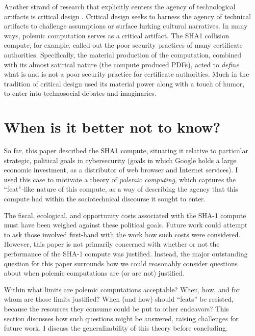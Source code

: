 \documentclass[sigconf]{acmart}
\begin{document}
Another strand of research that explicitly centers the agency of technological artifacts
is critical design \cite{Dunne2001}.
Critical design seeks to harness the agency of technical artifacts 
to challenge assumptions or surface lurking cultural narratives.
In many ways, polemic computation serves as a critical artifact.
The SHA1 collision compute, for example, 
called out the poor security practices of many certificate authorities.
Specifically, the material production of the computation,
combined with its almost satirical nature (the compute produced PDFs),
acted to \emph{define} what is and is not a poor security practice for certificate authorities.
Much in the tradition of critical design
used its material power \cite{Bennett2013a} along with a touch of humor, to enter into technosocial debates and imaginaries.

\section{When is it better not to know?}
\label{sec:org04604e5}

So far, this paper described the SHA1 compute, situating it relative to particular strategic, political goals in cybersecurity (goals in which Google holds a large economic investment, as a distributor of web browser and Internet services).
I used this case to motivate a theory of \emph{polemic computing}, which captures the ``feat''-like nature of this compute, as a way of describing the agency that this compute had within the sociotechnical discourse it sought to enter.

The fiscal, ecological, and opportunity costs associated with the SHA-1 compute must have been weighed against these political goals. Future work could attempt to ask those involved first-hand with the work how such costs were considered.
However, this paper is not primarily concerned with whether or not the performance of the SHA-1 compute was justified. 
Instead, the major outstanding question for this paper surrounds how we could reasonably consider questions about when polemic computations are (or are not) justified.

Within what limits are polemic computations acceptable?
When, how, and for whom are those limits justified? 
When (and how) should ``feats'' be resisted, because the resources they consume could be put to other endeavors? 
This section discusses how such questions might be answered, raising challenges for future work. 
I discuss the generalizability of this theory before concluding.
\end{document}
